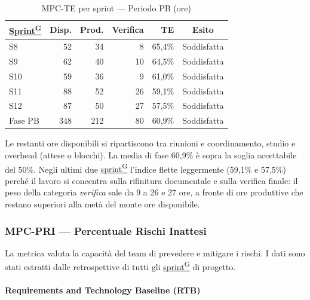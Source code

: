 \documentclass[a4paper,12pt]{article}
\providecommand{\glslink}[2]{\href{https://alittlebyte-19.github.io/Documentazione/glossario.html\#gls-#1}{\underline{#2}\textsuperscript{\scriptsize G}}}
\begin{document}
\begin{table}[H]
\centering
{}
\begin{tabular}{|l|r|r|r|r|c|}
    \hline
    \rowcolor{gray!35}
    \textbf{\glslink{sprint}{Sprint}} & \textbf{Disp.} & \textbf{Prod.} & \textbf{Verifica} & \textbf{TE} & \textbf{Esito} \\
    \hline
    S8 & 52 & 34 & 8 & 65,4\% & \textcolor{green!60!black}{Soddisfatta} \\
    S9 & 62 & 40 & 10 & 64,5\% & \textcolor{green!60!black}{Soddisfatta} \\
    S10 & 59 & 36 & 9 & 61,0\% & \textcolor{green!60!black}{Soddisfatta} \\
    S11 & 88 & 52 & 26 & 59,1\% & \textcolor{green!60!black}{Soddisfatta} \\
    S12 & 87 & 50 & 27 & 57,5\% & \textcolor{green!60!black}{Soddisfatta} \\
    \hline
    Fase PB & 348 & 212 & 80 & 60,9\% & \textcolor{green!60!black}{Soddisfatta} \\
    \hline
\end{tabular}
\caption{MPC-TE per sprint — Periodo PB (ore)}
\end{table}

Le restanti ore disponibili si ripartiscono tra riunioni e coordinamento, studio e overhead (attese o blocchi). La media di fase 60,9\% è sopra la soglia accettabile del 50\%. Negli ultimi due \glslink{sprint}{sprint} l'indice flette leggermente (59,1\% e 57,5\%) perché il lavoro si concentra sulla rifinitura documentale e sulla verifica finale: il peso della categoria \textit{verifica} sale da 9 a 26 e 27 ore, a fronte di ore produttive che restano superiori alla metà del monte ore disponibile.

\subsubsection{MPC-PRI — Percentuale Rischi Inattesi}

La metrica valuta la capacità del team di prevedere e mitigare i rischi. I dati sono stati estratti dalle retrospettive di tutti gli \glslink{sprint}{sprint} di progetto.

\paragraph*{Requirements and Technology Baseline (RTB)}
\end{document}
